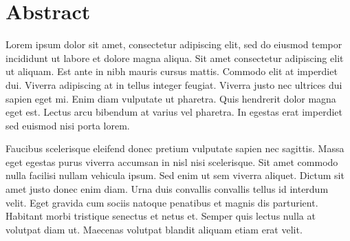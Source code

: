 \section*{Abstract}

Lorem ipsum dolor sit amet, consectetur adipiscing elit, sed do eiusmod tempor
incididunt ut labore et dolore magna aliqua. Sit amet consectetur adipiscing
elit ut aliquam. Est ante in nibh mauris cursus mattis. Commodo elit at
imperdiet dui. Viverra adipiscing at in tellus integer feugiat. Viverra justo
nec ultrices dui sapien eget mi. Enim diam vulputate ut pharetra. Quis
hendrerit dolor magna eget est. Lectus arcu bibendum at varius vel pharetra. In
egestas erat imperdiet sed euismod nisi porta lorem.

Faucibus scelerisque eleifend donec pretium vulputate sapien nec sagittis.
Massa eget egestas purus viverra accumsan in nisl nisi scelerisque. Sit amet
commodo nulla facilisi nullam vehicula ipsum. Sed enim ut sem viverra aliquet.
Dictum sit amet justo donec enim diam. Urna duis convallis convallis tellus id
interdum velit. Eget gravida cum sociis natoque penatibus et magnis dis
parturient. Habitant morbi tristique senectus et netus et. Semper quis lectus
nulla at volutpat diam ut. Maecenas volutpat blandit aliquam etiam erat velit.
